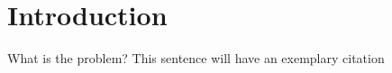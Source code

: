 \section{Introduction}
What is the problem?
This sentence will have an exemplary citation \cite{MyReferenceID}

